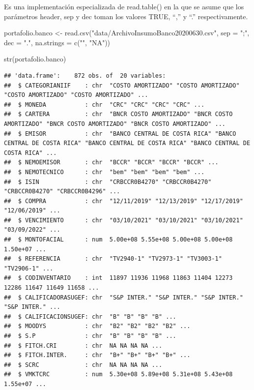 \documentclass[
  12pt,
]{book}
\newenvironment{Shaded}{\begin{snugshade}}{\end{snugshade}}
\newcommand{\AttributeTok}[1]{\textcolor[rgb]{0.77,0.63,0.00}{#1}}
\newcommand{\FunctionTok}[1]{\textcolor[rgb]{0.00,0.00,0.00}{#1}}
\newcommand{\NormalTok}[1]{#1}
\newcommand{\OtherTok}[1]{\textcolor[rgb]{0.56,0.35,0.01}{#1}}
\newcommand{\StringTok}[1]{\textcolor[rgb]{0.31,0.60,0.02}{#1}}
\begin{document}
Es una implementación especializada de read.table() en la que se asume
que los parámetros header, sep y dec toman los valores TRUE, ``,'' y ``.'' respectivamente.

\begin{Shaded}
\begin{Highlighting}[]
\NormalTok{portafolio.banco }\OtherTok{\textless{}{-}} \FunctionTok{read.csv}\NormalTok{(}\StringTok{"data/ArchivoInsumoBanco20200630.csv"}\NormalTok{, }\AttributeTok{sep =} \StringTok{";"}\NormalTok{, }\AttributeTok{dec =} \StringTok{"."}\NormalTok{, }\AttributeTok{na.strings =} \FunctionTok{c}\NormalTok{(}\StringTok{""}\NormalTok{, }\StringTok{"NA"}\NormalTok{))}

\FunctionTok{str}\NormalTok{(portafolio.banco)}
\end{Highlighting}
\end{Shaded}

\begin{verbatim}
## 'data.frame':    872 obs. of  20 variables:
##  $ CATEGORIANIIF    : chr  "COSTO AMORTIZADO" "COSTO AMORTIZADO" "COSTO AMORTIZADO" "COSTO AMORTIZADO" ...
##  $ MONEDA           : chr  "CRC" "CRC" "CRC" "CRC" ...
##  $ CARTERA          : chr  "BNCR COSTO AMORTIZADO" "BNCR COSTO AMORTIZADO" "BNCR COSTO AMORTIZADO" "BNCR COSTO AMORTIZADO" ...
##  $ EMISOR           : chr  "BANCO CENTRAL DE COSTA RICA" "BANCO CENTRAL DE COSTA RICA" "BANCO CENTRAL DE COSTA RICA" "BANCO CENTRAL DE COSTA RICA" ...
##  $ NEMOEMISOR       : chr  "BCCR" "BCCR" "BCCR" "BCCR" ...
##  $ NEMOTECNICO      : chr  "bem" "bem" "bem" "bem" ...
##  $ ISIN             : chr  "CRBCCR0B4270" "CRBCCR0B4270" "CRBCCR0B4270" "CRBCCR0B4296" ...
##  $ COMPRA           : chr  "12/11/2019" "12/13/2019" "12/17/2019" "12/06/2019" ...
##  $ VENCIMIENTO      : chr  "03/10/2021" "03/10/2021" "03/10/2021" "03/09/2022" ...
##  $ MONTOFACIAL      : num  5.00e+08 5.55e+08 5.00e+08 5.00e+08 1.50e+07 ...
##  $ REFERENCIA       : chr  "TV2940-1" "TV2973-1" "TV3003-1" "TV2906-1" ...
##  $ CODINVENTARIO    : int  11897 11936 11968 11863 11404 12273 12286 11647 11649 11658 ...
##  $ CALIFICADORASUGEF: chr  "S&P INTER." "S&P INTER." "S&P INTER." "S&P INTER." ...
##  $ CALIFICACIONSUGEF: chr  "B" "B" "B" "B" ...
##  $ MOODYS           : chr  "B2" "B2" "B2" "B2" ...
##  $ S.P              : chr  "B" "B" "B" "B" ...
##  $ FITCH.CRI        : chr  NA NA NA NA ...
##  $ FITCH.INTER.     : chr  "B+" "B+" "B+" "B+" ...
##  $ SCRC             : chr  NA NA NA NA ...
##  $ VMKTCRC          : num  5.30e+08 5.89e+08 5.31e+08 5.43e+08 1.55e+07 ...
\end{verbatim}
\end{document}
